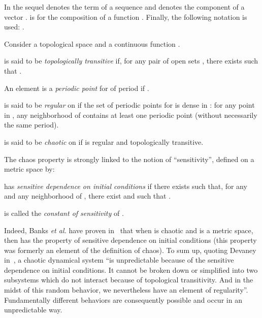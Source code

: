 \documentclass{article}
\begin{document}
In the sequel  denotes the  term of a sequence  and 
denotes the  component of a vector . 
is for the  composition of a function . Finally, the following
notation is used: .


Consider a topological space  and a continuous function .

\begin{definition}
 is said to be \emph{topologically transitive} if, for any pair of open sets
, there exists  such that .
\end{definition}

\begin{definition}
An element  is a \emph{periodic point} for  of period 
if .\end{definition}

\begin{definition}
 is said to be \emph{regular} on  if the set of periodic
points for  is dense in : for any point  in ,
any neighborhood of  contains at least one periodic point (without
necessarily the same period).
\end{definition}


\begin{definition}
 is said to be \emph{chaotic} on  if  is regular and
topologically transitive.
\end{definition}

The chaos property is strongly linked to the notion of ``sensitivity'', defined
on a metric space  by:

\begin{definition}
\label{sensitivity}  has \emph{sensitive dependence on initial conditions}
if there exists  such that, for any  and any
neighborhood  of , there exist  and  such that
.

 is called the \emph{constant of sensitivity} of .
\end{definition}

Indeed, Banks \emph{et al.} have proven in~\cite{Banks92} that when  is
chaotic and  is a metric space, then  has the property of
sensitive dependence on initial conditions (this property was formerly an
element of the definition of chaos). To sum up, quoting Devaney
in~\cite{Devaney}, a chaotic dynamical system ``is unpredictable because of the
sensitive dependence on initial conditions. It cannot be broken down or
simplified into two subsystems which do not interact because of topological
transitivity. And in the midst of this random behavior, we nevertheless have an
element of regularity''. Fundamentally different behaviors are consequently
possible and occur in an unpredictable way.
\end{document}
